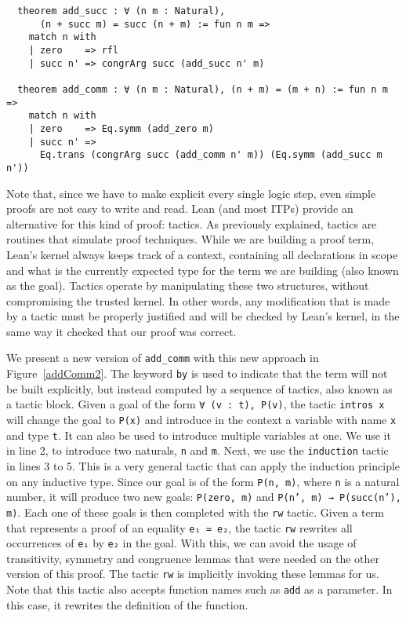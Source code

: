 \begin{verbatim}
  theorem add_succ : ∀ (n m : Natural),
      (n + succ m) = succ (n + m) := fun n m =>
    match n with
    | zero    => rfl
    | succ n' => congrArg succ (add_succ n' m)

  theorem add_comm : ∀ (n m : Natural), (n + m) = (m + n) := fun n m =>
    match n with
    | zero    => Eq.symm (add_zero m)
    | succ n' =>
      Eq.trans (congrArg succ (add_comm n' m)) (Eq.symm (add_succ m n'))
\end{verbatim}

Note that, since we have to make explicit every single logic step, even simple proofs are not easy to write and read. Lean (and most ITPs) provide an alternative for this kind of proof: tactics. As previously explained, tactics are routines that simulate proof techniques. While we are building a proof term, Lean's kernel always keeps track of a context, containing all declarations in scope and what is the currently expected type for the term we are building (also known as the goal). Tactics operate by manipulating these two structures, without compromising the trusted kernel. In other words, any modification that is made by a tactic must be properly justified and will be checked by Lean's kernel, in the same way it checked that our proof was correct.

We present a new version of \texttt{add\_comm} with this new approach in Figure~\ref{addComm2}.
The keyword \texttt{by} is used to indicate that the term will not be built explicitly, but instead computed by a sequence of tactics, also known as a tactic block. Given a goal of the form \texttt{∀ (v : t), P(v)}, the tactic \texttt{intros x} will change the goal to \texttt{P(x)} and introduce in the context a variable with name \texttt{x} and type \texttt{t}. It can also be used to introduce multiple variables at one. We use it in line 2, to introduce two naturals, \texttt{n} and \texttt{m}. Next, we use the \texttt{induction} tactic in lines 3 to 5. This is a very general tactic that can apply the induction principle on any inductive type. Since our goal is of the form \texttt{P(n, m)}, where \texttt{n} is a natural number, it will produce two new goals: \texttt{P(zero, m)} and \texttt{P(n', m) → P(succ(n'), m)}. Each one of these goals is then completed with the \texttt{rw} tactic. Given a term that represents a proof of an equality \texttt{e₁ ≃ e₂}, the tactic \texttt{rw} rewrites all occurrences of \texttt{e₁} by \texttt{e₂} in the goal. With this, we can avoid the usage of transitivity, symmetry and congruence lemmas that were needed on the other version of this proof. The tactic \texttt{rw} is implicitly invoking these lemmas for us. Note that this tactic also accepts function names such as \texttt{add} as a parameter. In this case, it rewrites the definition of the function.

